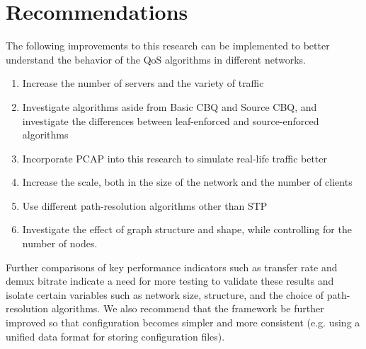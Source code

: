 \section{Recommendations}
The following improvements to this research can be implemented to better understand the behavior of the QoS algorithms in different networks.
\begin{enumerate}
    \item Increase the number of servers and the variety of traffic
    \item Investigate algorithms aside from Basic CBQ and Source CBQ, and investigate the differences between leaf-enforced and source-enforced algorithms
    \item Incorporate PCAP into this research to simulate real-life traffic better
    \item Increase the scale, both in the size of the network and the number of clients
    \item Use different path-resolution algorithms other than STP
    \item Investigate the effect of graph structure and shape, while controlling for the number of nodes.
\end{enumerate}
Further comparisons of key performance indicators such as transfer rate and demux bitrate indicate a need for more testing to validate these results and isolate certain variables such as network size, structure, and the choice of path-resolution algorithms. We also recommend that the framework be further improved so that configuration becomes simpler and more consistent (e.g. using a unified data format for storing configuration files).
